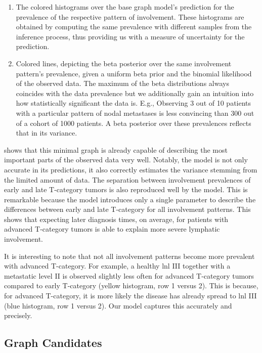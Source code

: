 \documentclass[twocolumn]{aastex631}
\begin{document}
\begin{enumerate}
    \item The colored histograms over the base graph model's prediction for the prevalence of the respective pattern of involvement. These histograms are obtained by computing the same prevalence with different samples from the inference process, thus providing us with a measure of uncertainty for the prediction.
    \item Colored lines, depicting the beta posterior over the same involvement pattern's prevalence, given a uniform beta prior and the binomial likelihood of the observed data. The maximum of the beta distributions always coincides with the data prevalence but we additionally gain an intuition into how statistically significant the data is. E.g., Observing 3 out of 10 patients with a particular pattern of nodal metastases is less convincing than 300 out of a cohort of 1000 patients. A beta posterior over these prevalences reflects that in its variance.
\end{enumerate}

 shows that this minimal graph is already capable of describing the most important parts of the observed data very well. Notably, the model is not only accurate in its predictions, it also correctly estimates the variance stemming from the limited amount of data. The separation between involvement prevalences of early and late T-category tumors is also reproduced well by the model. This is remarkable because the model introduces only a single parameter to describe the differences between early and late T-category for all involvement patterns. This shows that expecting later diagnosis times, on average, for patients with advanced T-category tumors is able to explain more severe lymphatic involvement.

It is interesting to note that not all involvement patterns become more prevalent with advanced T-category. For example, a healthy \gls{lnl} III together with a metastatic level II is observed slightly less often for advanced T-category tumors compared to early T-category (yellow histogram, row 1 versus 2). This is because, for advanced T-category, it is more likely the disease has already spread to \gls{lnl} III (blue histogram, row 1 versus 2). Our model captures this accurately and precisely.


\subsection{Graph Candidates}
\label{subsec:results:graph_candidates}
\end{document}

